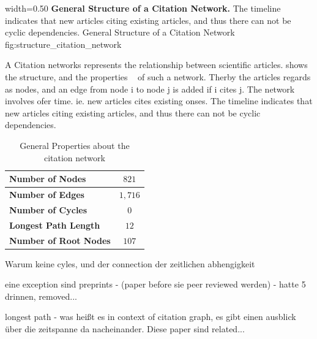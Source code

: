       {width=0.50\textwidth}
      {\textbf{General Structure of a Citation Network.} The timeline indicates that new articles citing existing articles, and thus there can not be cyclic dependencies.}
      {General Structure of a Citation Network}
      {fig:structure_citation_network}

A Citation networks represents the relationship between scientific articles.  shows the structure, and the properties ~\cite{kas2011} of such a network. Therby the articles regards as nodes, and an edge from node i to node j is added if i cites j. The network involves ofer time. ie. new articles cites existing onses. The timeline indicates that new articles citing existing articles, and thus there can not be cyclic dependencies.

\begin{table}[!b]
  \centering
  \begin{tabular}{ l c }
    \toprule
    \textbf{Number of Nodes}      & $821$  \\ \midrule
    \textbf{Number of Edges}      & $1,716$ \\ \midrule
    \textbf{Number of Cycles}     & $0$    \\ \midrule
    \textbf{Longest Path Length}  & $12$   \\ \midrule
    \textbf{Number of Root Nodes} & $107$  \\
    \bottomrule
  \end{tabular}
  \caption[General Properties about the citation network]{General Properties about the citation network}
  \label{tbl:general_properties_about_the_graph}
\end{table}

Warum keine cyles, und der connection der zeitlichen abhengigkeit

eine exception sind preprints - (paper before sie peer reviewed werden) - hatte 5 drinnen, removed...

longest path - was heißt es in context of citation graph, es gibt einen ausblick über die zeitspanne da nacheinander. Diese paper sind related...

